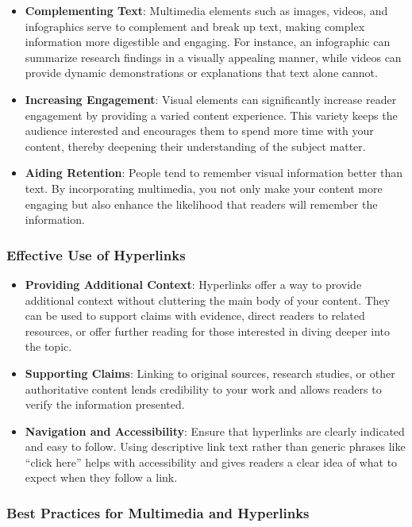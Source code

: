 \documentclass[
]{book}
\begin{document}
\begin{itemize}
\item
  \textbf{Complementing Text}: Multimedia elements such as images, videos, and infographics serve to complement and break up text, making complex information more digestible and engaging. For instance, an infographic can summarize research findings in a visually appealing manner, while videos can provide dynamic demonstrations or explanations that text alone cannot.
\item
  \textbf{Increasing Engagement}: Visual elements can significantly increase reader engagement by providing a varied content experience. This variety keeps the audience interested and encourages them to spend more time with your content, thereby deepening their understanding of the subject matter.
\item
  \textbf{Aiding Retention}: People tend to remember visual information better than text. By incorporating multimedia, you not only make your content more engaging but also enhance the likelihood that readers will remember the information.
\end{itemize}

\hypertarget{effective-use-of-hyperlinks}{%
\subsubsection{Effective Use of Hyperlinks}\label{effective-use-of-hyperlinks}}

\begin{itemize}
\item
  \textbf{Providing Additional Context}: Hyperlinks offer a way to provide additional context without cluttering the main body of your content. They can be used to support claims with evidence, direct readers to related resources, or offer further reading for those interested in diving deeper into the topic.
\item
  \textbf{Supporting Claims}: Linking to original sources, research studies, or other authoritative content lends credibility to your work and allows readers to verify the information presented.
\item
  \textbf{Navigation and Accessibility}: Ensure that hyperlinks are clearly indicated and easy to follow. Using descriptive link text rather than generic phrases like ``click here'' helps with accessibility and gives readers a clear idea of what to expect when they follow a link.
\end{itemize}

\hypertarget{best-practices-for-multimedia-and-hyperlinks}{%
\subsubsection{Best Practices for Multimedia and Hyperlinks}\label{best-practices-for-multimedia-and-hyperlinks}}
\end{document}
